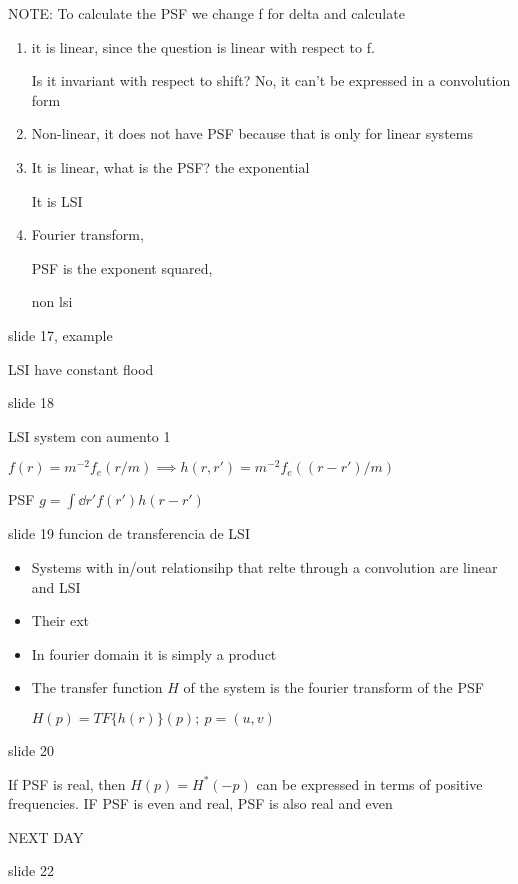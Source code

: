 \documentclass[../main/main.tex]{subfiles}
\begin{document}
NOTE: To calculate the PSF we change f for delta and calculate
\begin{enumerate}
	\item it is linear, since the question is linear with respect to f.

	Is it invariant with respect to shift? No, it can't be expressed in a convolution form

	\item Non-linear, it does not have PSF because that is only for linear systems

	\item It is linear, what is the PSF? the exponential

	It is LSI

	\item Fourier transform,

	PSF is the exponent squared,

	non lsi

\end{enumerate}

slide 17, example

LSI have constant flood


slide 18

LSI system con aumento 1



$f(r) = m^{-2}f_{e}(r/m) \implies h(r, r') = m^{-2}f_{e}((r-r')/m) $


PSF $g = \int \dd{r'} f(r') h(r-r')$


slide 19 funcion de transferencia de LSI


\begin{itemize}
	\item Systems with in/out relationsihp that relte through a convolution are linear and LSI
	\item Their ext
	\item In fourier domain it is simply a product
	\item The transfer function $H$ of the system is the fourier transform of the PSF

	$H(p) = TF\{h(r)\}(p);\ p=(u,v)$

\end{itemize}


slide 20

If PSF is real, then $H(p) = H^{*}(-p)$ can be expressed in terms of positive frequencies. IF PSF is even and real, PSF is also real and even


NEXT DAY

slide 22
\end{document}
